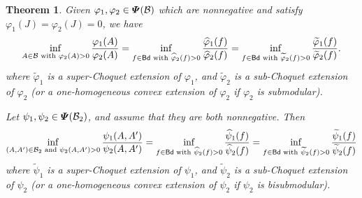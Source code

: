 \documentclass[12pt,a4paper]{article}
\newtheorem{theorem}{Theorem}[section]
\begin{document}
\begin{theorem}\label{thm:tilde-fg-equal}
Given $\varphi_1,\varphi_2\in\bm{\varPsi}(\mathcal{B})$ which are nonnegative and satisfy $\varphi_1(J)=\varphi_2(J)=0$, we have 
\begin{equation}\label{eq:Choquet-identity}
\inf_{A\in\mathcal{B}\text{ with }\varphi_2(A)>0}\frac{\varphi_1(A)}{\varphi_2(A)} =\inf_{f\in {\sf Bd}\text{ with }\widehat{\varphi}_2(f)>0}\frac{\widehat{\varphi}_1(f)}{\widehat{\varphi}_2(f)}   =\inf_{f\in {\sf Bd}\text{ with }\widetilde{\varphi}_2(f)>0}\frac{\widetilde{\varphi}_1(f)}{\widetilde{\varphi}_2(f)} .  
\end{equation}
where $\widetilde{\varphi}_1$ is a super-Choquet extension  of $\varphi_1$, and $\widetilde{\varphi}_2$ is a sub-Choquet extension  of $\varphi_2$ (or a one-homogeneous convex extension of $\varphi_2$ if $\varphi_2$ is submodular). 

Let $\psi_1, \psi_2 \in \bm{\varPsi}(\mathcal{B}_2)$, and assume that they are both nonnegative. 
Then \begin{equation}\label{eq:Choquet-pair-identity}
\inf_{(A,A')\in \mathcal{B}_2\text{ and }\psi_2(A,A')>0}\frac{\psi_1(A,A')}{\psi_2(A,A')}=\inf_{f\in {\sf Bd}\text{ with }\widehat{\psi}_2(f)>0}\frac{\widehat{\psi}_1(f)}{\widehat{\psi}_2(f)}=\inf_{f\in {\sf Bd}\text{ with }\widetilde{\psi}_2(f)>0}\frac{\widetilde{\psi}_1(f)}{\widetilde{\psi}_2(f)}   
\end{equation}
where $\widetilde{\psi}_1$ is a super-Choquet extension  of $\psi_1$, and $\widetilde{\psi}_2$ is a sub-Choquet extension of $\psi_2$  (or a one-homogeneous convex extension of $\psi_2$ if $\psi_2$ is bisubmodular).

\end{theorem}
\end{document}
